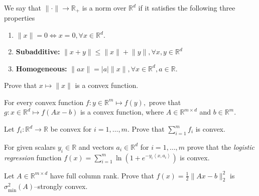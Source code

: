 \documentclass[11pt]{article}
\newcommand{\R}{\mathbb{R}}
\newcommand{\norm}[1]{\lVert#1\rVert}
\newcommand{\dotprod}[1]{\left< #1\right>}
\begin{document}
\begin{ExerciseList}
    \Exercise We say that $\norm{\cdot} \rightarrow \R_+$ is a norm over $\R^d$ if it satisfies the following three properties
 \begin{enumerate}
\item \hspace{0.5cm}{\bf Point separating:} $\norm{x} =0 \Leftrightarrow  x=0, \forall x \in \R^d.$\label{it:pntsep}
\item \hspace{0.5cm} {\bf Subadditive:} $\norm{x +y} \leq \norm{x}+\norm{y}, \forall x,y \in \R^d$ \label{it:subadd}
\item \hspace{0.5cm} {\bf Homogeneous:} $ \norm{ax} =|a|\norm{x}, \forall x \in \R^d, a \in \R.$ \label{it:homo}
 \end{enumerate}
\ExePart \label{I} Prove that $x \mapsto \norm{x}$ is a convex function.
  
 \ExePart \label{II} For every convex function $f: y\in \R^m \mapsto f(y),$ prove that $g: x\in \R^d \mapsto f(Ax-b) $ is a convex function, where $A \in \R^{m\times d}$ and $b \in \R^m.$ 
  
  \ExePart \label{V} Let $f_i:\R^d \rightarrow \R$ be convex for $i =1,\ldots, m.$ Prove that $\sum_{i=1}^mf_i$ is convex.
   
\ExePart \label{III} For  given scalars $y_i \in \R$ and vectors $a_i \in \R^d$ for $i=1,\ldots, m$ prove that the \emph{logistic regression} function $f(x) = \sum_{i=1}^m \ln(1+e^{-y_i\dotprod{x,a_i}})$ is convex.
 
\ExePart \label{IV} Let $A \in \R^{m \times d}$ have full column rank. Prove that $f(x) = \tfrac{1}{2}\norm{Ax -b}_2^2$ is $\sigma_{\min}^2(A)$--strongly convex.



\end{ExerciseList}
\end{document}
